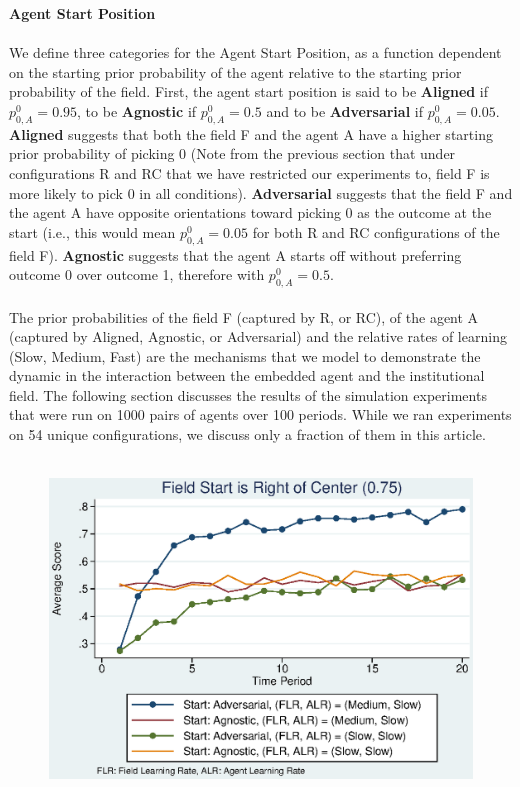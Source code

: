 \documentclass[12pt]{article}
\begin{document}
\textbf{Agent Start Position}\\\\
We define three categories for the Agent Start Position, as a function dependent on the starting prior probability of the agent relative to the starting prior probability of the field. First, the agent start position is said to be \textbf{Aligned} if $p_{0,A}^0 = 0.95$, to be \textbf{Agnostic} if $p_{0,A}^0 = 0.5$ and to be \textbf{Adversarial} if $p_{0,A}^0 = 0.05$. \textbf{Aligned} suggests that both the field F and the agent A have a higher starting prior probability of picking 0 (Note from the previous section that under configurations R and RC that we have restricted our experiments to, field F is more likely to pick 0 in all conditions). \textbf{Adversarial} suggests that the field F and the agent A have opposite orientations toward picking 0 as the outcome at the start (i.e., this would mean $p_{0,A}^0 = 0.05$ for both R and RC configurations of the field F). \textbf{Agnostic} suggests that the agent A starts off without preferring outcome 0 over outcome 1, therefore with $p_{0,A}^0 = 0.5$.\\\\

\noindent The prior probabilities of the field F (captured by R, or RC), of the agent A (captured by Aligned, Agnostic, or Adversarial) and the relative rates of learning (Slow, Medium, Fast) are the mechanisms that we model to demonstrate the dynamic in the interaction between the embedded agent and the institutional field. The following section discusses the results of the simulation experiments that were run on 1000 pairs of agents over 100 periods. While we ran experiments on 54 unique configurations, we discuss only a fraction of them in this article.\\\\
\begin{figure}[h]
\begin{centering}
  \includegraphics[width=\textwidth]{frcmedium3a}
  \caption{}
  \label{fig:3a}
\end{centering}
\end{figure}
\end{document}
